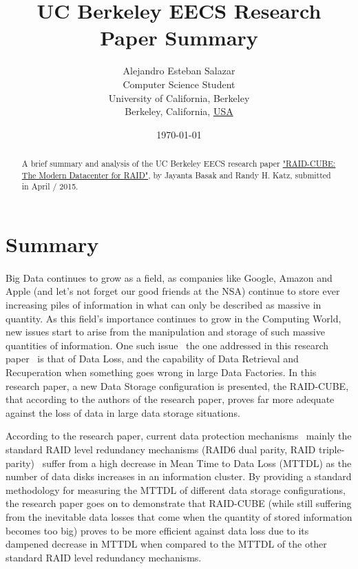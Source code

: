\documentclass[12pt]{report}
\title{UC Berkeley EECS Research Paper Summary}
\author{
        Alejandro Esteban Salazar \\
        Computer Science Student\\
        University of California, Berkeley\\
        Berkeley, California, \underline{USA}
}
\date{\today}
\begin{document}
\maketitle

\begin{abstract}
A brief summary and analysis of the UC Berkeley EECS research paper \hyperref[http://www.eecs.berkeley.edu/Pubs/TechRpts/2015/EECS-2015-4.pdf]{"RAID-CUBE: The Modern Datacenter for RAID"}, by Jayanta Basak and Randy H. Katz, submitted in April / 2015.
\end{abstract}

\section{Summary}

\paragraph{}
Big Data continues to grow as a field, as companies like Google, Amazon and Apple (and let's not forget our good friends at the NSA) continue to store ever increasing piles of information in what can only be described as massive in quantity. As this field's importance continues to grow in the Computing World, new issues start to arise from the manipulation and storage of such massive quantities of information. One such issue \textendash\  the one addressed in this research paper \textendash\ is that of Data Loss, and the capability of Data Retrieval and Recuperation when something goes wrong in large Data Factories. In this research paper, a new Data Storage configuration is presented, the RAID-CUBE, that according to the authors of the research paper, proves far more adequate against the loss of data in large data storage situations.

According to the research paper, current data protection mechanisms \textendash\ mainly the standard RAID level redundancy mechanisms (RAID6 dual parity, RAID triple-parity) \textendash\ suffer from a high decrease in Mean Time to Data Loss (MTTDL) as the number of data disks increases in an information cluster. By providing a standard methodology for measuring the MTTDL of different data storage configurations, the research paper goes on to demonstrate that RAID-CUBE (while still suffering from the inevitable data losses that come when the quantity of stored information becomes too big) proves to be more efficient against data loss due to its dampened decrease in MTTDL when compared to the MTTDL of the other standard RAID level redundancy mechanisms.
\end{document}

